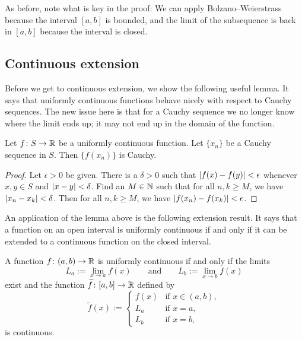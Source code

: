 As before, note what is key in the proof: We can apply Bolzano--Weierstrass
because the interval $[a,b]$ is bounded, and the limit of the subsequence is
back in $[a,b]$ because the interval is closed.

\subsection{Continuous extension}

Before we get to continuous extension, we show the following useful lemma.
It says that uniformly continuous functions behave nicely with respect
to Cauchy sequences.  The new issue here is that for a Cauchy sequence
we no longer know where the limit ends up; it may not end up in the domain
of the function.

\begin{lemma} \label{unifcauchycauchy:lemma}
Let $f \colon S \to {\mathbb{R}}$ be a uniformly continuous function.  Let
$\{ x_n \}$ be a Cauchy sequence in $S$.  Then $\{ f(x_n) \}$ is Cauchy.
\end{lemma}

\begin{proof}
Let $\epsilon > 0$ be given.  There is a $\delta > 0$ such that
$\left\lvert {f(x)-f(y)} \right\rvert < \epsilon$ whenever $x,y \in S$ and $\left\lvert {x-y} \right\rvert < \delta$.  Find an $M
\in {\mathbb{N}}$ such that for all $n, k \geq M$, we have $\left\lvert {x_n-x_k} \right\rvert < \delta$.
Then for all $n, k \geq M$, we have $\left\lvert {f(x_n)-f(x_k)} \right\rvert < \epsilon$.
\end{proof}

An application of the lemma above is the following extension result.  It says that
a function on an open interval is uniformly continuous if and only if
it can be extended to a continuous function on the closed interval.

\begin{prop} \label{context:prop}
A function $f \colon (a,b) \to {\mathbb{R}}$ is uniformly continuous if and only if
the limits 
\begin{equation*}
L_a := \lim_{x \to a} f(x) \qquad \text{and} \qquad
L_b := \lim_{x \to b} f(x)
\end{equation*}
exist and the function $\widetilde{f} \colon [a,b] \to {\mathbb{R}}$
defined by
\begin{equation*}
\widetilde{f}(x) :=
\begin{cases}
f(x) & \text{if } x \in (a,b), \\
L_a & \text{if } x = a, \\
L_b & \text{if } x = b,
\end{cases}
\end{equation*}
is continuous.
\end{prop}

